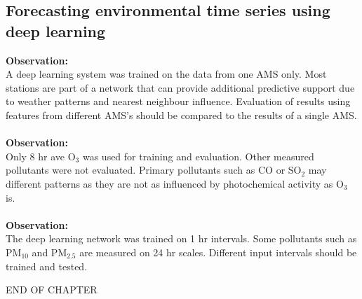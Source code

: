\subsection*{Forecasting environmental time series using deep learning}
\noindent
\textbf{Observation:}\\
A deep learning system was trained on the data from one AMS only. Most stations are part of a network that can provide additional predictive support due to weather patterns and nearest neighbour influence. Evaluation of results using features from different AMS's should be compared to the results of a single AMS.\\
\noindent\\
\textbf{Observation:}\\
Only 8 hr ave O$_{3}$ was used for training and evaluation. Other measured pollutants were not evaluated. Primary pollutants such as CO or SO$_{2}$  may different patterns as they are not as influenced by photochemical activity as O$_{3}$ is.\\
\noindent\\
\textbf{Observation:}\\
The deep learning network was trained on 1 hr intervals. Some pollutants such as PM$_{10}$ and PM$_{2.5}$ are measured on 24 hr scales. Different input intervals should be trained and tested.

\bigskip

\begin{center}
END OF CHAPTER
\end{center}




